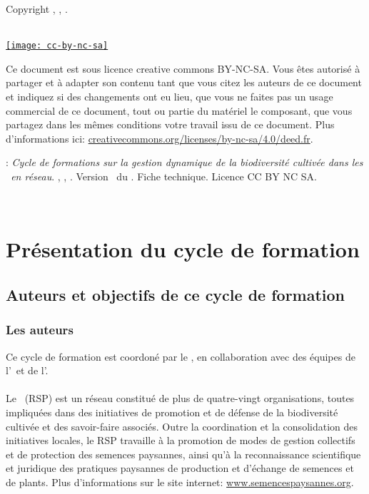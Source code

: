 \normalsize

\vfill

\begin{center}
Copyright \RSP, \INRA, \ITAB.

~\\

\href{http://creativecommons.org/licenses/by-nc-sa/4.0/deed.fr}{\texttt{[image: cc-by-nc-sa]}}
\end{center}

\small
Ce document est sous licence creative commons BY-NC-SA.
Vous êtes autorisé à partager et à adapter son contenu tant 
que vous citez les auteurs de ce document et indiquez si des changements ont eu lieu, 
que vous ne faites pas un usage commercial de ce document, tout ou partie du matériel le composant,
que vous partagez dans les mêmes conditions votre travail issu de ce document. 
Plus d'informations ici: \url{creativecommons.org/licenses/by-nc-sa/4.0/deed.fr}.

\vfill

:
\textit{
Cycle de formations sur la gestion dynamique de la biodiversité cultivée dans les
\MSPs~en réseau}.
\RSP, \INRA, \ITAB.
Version \versionCF~du \dateversionCF.
Fiche technique.
Licence CC BY NC SA.


\newpage ~\\ \newpage \tableofcontents \newpage \pagestyle{plain}

\chapter{Présentation du cycle de formation}
\startcontents[chapters]

\section{Auteurs et objectifs de ce cycle de formation}

\subsection{Les auteurs}

Ce cycle de formation est coordoné par le \RSP, en collaboration avec des équipes de l'\INRA~et de l'\ITAB.

\subsubsection{\RSP}
Le \RSP~(RSP) est un réseau constitué de plus de quatre-vingt organisations, toutes impliquées dans des initiatives de promotion et de défense de la biodiversité cultivée et des savoir-faire associés.
Outre la coordination et la consolidation des initiatives locales, le RSP travaille à la promotion de modes de gestion collectifs et de protection des semences paysannes, ainsi qu'à la reconnaissance scientifique et juridique des pratiques paysannes de production et d'échange de semences et de plants.
Plus d'informations sur le site internet: \url{www.semencespaysannes.org}.

